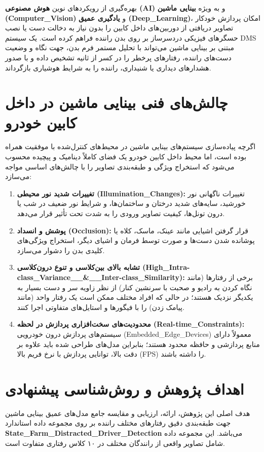 \documentclass{report}
\begin{document}
 	بهره‌گیری از رویکردهای نوین \textbf{هوش مصنوعی (AI)} و به ویژه \textbf{بینایی ماشین (Computer\_Vision)} و \textbf{یادگیری عمیق (Deep\_Learning)}، امکان پردازش خودکار تصاویر دریافتی از دوربین‌های داخل کابین را بدون نیاز به دخالت دست یا نصب حسگرهای فیزیکی دردسرساز بر روی بدن راننده فراهم کرده است. یک سیستم DMS مبتنی بر بینایی ماشین می‌تواند با تحلیل مستمر فرم بدن، جهت نگاه و وضعیت دست‌های راننده، رفتارهای پرخطر را در کسر از ثانیه تشخیص داده و با صدور هشدارهای دیداری یا شنیداری، راننده را به شرایط هوشیاری بازگرداند.
 	
 	\section{چالش‌های فنی بینایی ماشین در داخل کابین خودرو}
 	اگرچه پیاده‌سازی سیستم‌های بینایی ماشین در محیط‌های کنترل‌شده با موفقیت همراه بوده است، اما محیط داخل کابین خودرو یک فضای کاملاً دینامیک و پیچیده محسوب می‌شود که استخراج ویژگی و طبقه‌بندی تصاویر را با چالش‌های اساسی مواجه می‌سازد:
 	
 	\begin{enumerate}
 		\item \textbf{تغییرات شدید نور محیطی (Illumination\_Changes):} تغییرات ناگهانی نور خورشید، سایه‌های شدید درختان و ساختمان‌ها، و شرایط نور ضعیف در شب یا درون تونل‌ها، کیفیت تصاویر ورودی را به شدت تحت تأثیر قرار می‌دهد.
 		\item \textbf{پوشش و انسداد (Occlusion):} قرار گرفتن اشیایی مانند عینک، ماسک، کلاه یا پوشانده شدن دست‌ها و صورت توسط فرمان و اشیای دیگر، استخراج ویژگی‌های کلیدی بدن را دشوار می‌سازد.
 		\item \textbf{تشابه بالای بین‌کلاسی و تنوع درون‌کلاسی (High\_Intra-class\_Variance\_\_\&\_\_Inter-class\_Similarity):} برخی از رفتارها (مانند نگاه کردن به رادیو و صحبت با سرنشین کنار) از نظر زاویه سر و دست بسیار به یکدیگر نزدیک هستند؛ در حالی که افراد مختلف ممکن است یک رفتار واحد (مانند پیامک زدن) را با فیگورها و استایل‌های متفاوتی اجرا کنند.
 		\item \textbf{محدودیت‌های سخت‌افزاری پردازش در لحظه (Real-time\_Constraints):} سیستم‌های پردازش درون خودرویی (Embedded\_Edge\_Devices) معمولاً دارای منابع پردازشی و حافظه محدود هستند؛ بنابراین مدل‌های طراحی شده باید علاوه بر دقت بالا، توانایی پردازش با نرخ فریم بالا (FPS) را داشته باشند.
 	\end{enumerate}
 	
 	\section{اهداف پژوهش و روش‌شناسی پیشنهادی}
 	هدف اصلی این پژوهش، ارائه، ارزیابی و مقایسه جامع مدل‌های عمیق بینایی ماشین جهت طبقه‌بندی دقیق رفتارهای مختلف راننده بر روی مجموعه داده استاندارد \textbf{State\_Farm\_Distracted\_Driver\_Detection} می‌باشد. این مجموعه داده شامل تصاویر واقعی از رانندگان مختلف در ۱۰ کلاس رفتاری متفاوت است.
 	
\end{document}
